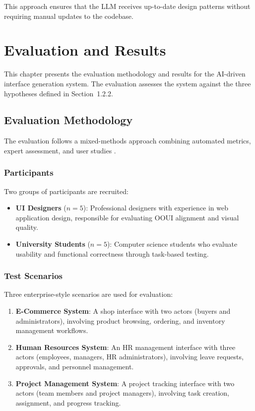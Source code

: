This approach ensures that the LLM receives up-to-date design patterns without requiring manual updates to the codebase.



\section{Evaluation and Results}

This chapter presents the evaluation methodology and results for the AI-driven interface generation system. The evaluation assesses the system against the three hypotheses defined in Section~1.2.2.

\subsection{Evaluation Methodology}

The evaluation follows a mixed-methods approach combining automated metrics, expert assessment, and user studies \cite{vD24, dH24}.

\subsubsection{Participants}

Two groups of participants are recruited:
\begin{itemize}
    \item \textbf{UI Designers} ($n = 5$): Professional designers with experience in web application design, responsible for evaluating OOUI alignment and visual quality.
    \item \textbf{University Students} ($n = 5$): Computer science students who evaluate usability and functional correctness through task-based testing.
\end{itemize}

\subsubsection{Test Scenarios}

Three enterprise-style scenarios are used for evaluation:
\begin{enumerate}
    \item \textbf{E-Commerce System}: A shop interface with two actors (buyers and administrators), involving product browsing, ordering, and inventory management workflows.
    \item \textbf{Human Resources System}: An HR management interface with three actors (employees, managers, HR administrators), involving leave requests, approvals, and personnel management.
    \item \textbf{Project Management System}: A project tracking interface with two actors (team members and project managers), involving task creation, assignment, and progress tracking.
\end{enumerate}

